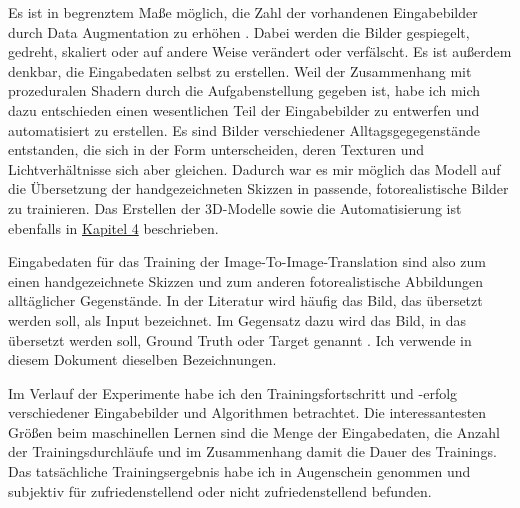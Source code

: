 Es ist in begrenztem Maße möglich, die Zahl der vorhandenen Eingabebilder durch Data Augmentation zu erhöhen \cite{chollet2017dlpython}. Dabei werden die Bilder gespiegelt, gedreht, skaliert oder auf andere Weise verändert oder verfälscht. Es ist außerdem denkbar, die Eingabedaten selbst zu erstellen. Weil der Zusammenhang mit prozeduralen Shadern durch die Aufgabenstellung gegeben ist, habe ich mich dazu entschieden einen wesentlichen Teil der Eingabebilder zu entwerfen und automatisiert zu erstellen. Es sind Bilder verschiedener Alltagsgegegenstände entstanden, die sich in der Form unterscheiden, deren Texturen und Lichtverhältnisse sich aber gleichen. Dadurch war es mir möglich das Modell auf die Übersetzung der handgezeichneten Skizzen in passende, fotorealistische Bilder zu trainieren. Das Erstellen der 3D-Modelle sowie die Automatisierung ist ebenfalls in \hyperref[ch:conduct]{Kapitel 4} beschrieben.

Eingabedaten für das Training der Image-To-Image-Translation sind also zum einen handgezeichnete Skizzen und zum anderen fotorealistische Abbildungen alltäglicher Gegenstände. In der Literatur wird häufig das Bild, das übersetzt werden soll, als Input bezeichnet. Im Gegensatz dazu wird das Bild, in das übersetzt werden soll, Ground Truth oder Target genannt \cite{chollet2017dlpython}. Ich verwende in diesem Dokument dieselben Bezeichnungen.

Im Verlauf der Experimente habe ich den Trainingsfortschritt und -erfolg verschiedener Eingabebilder und Algorithmen betrachtet. Die interessantesten Größen beim maschinellen Lernen sind die Menge der Eingabedaten, die Anzahl der Trainingsdurchläufe und im Zusammenhang damit die Dauer des Trainings. Das tatsächliche Trainingsergebnis habe ich in Augenschein genommen und subjektiv für zufriedenstellend oder nicht zufriedenstellend befunden.

